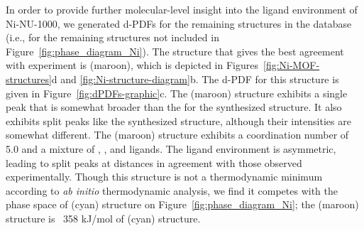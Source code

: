 In order to provide further molecular-level insight into the ligand environment of Ni-NU-1000, we generated d-PDFs for the remaining structures in the database (i.e., for the remaining structures not included in Figure~\ref{fig:phase_diagram_Ni}). The structure that gives the best agreement with experiment is  (maroon), which is depicted in Figures~\ref{fig:Ni-MOF-structures}d and \ref{fig:Ni-structure-diagram}b. The d-PDF for this structure is given in Figure~\ref{fig:dPDFs-graphic}c. The  (maroon) structure exhibits a single  peak that is somewhat broader than the for the synthesized structure. It also exhibits split  peaks like the synthesized structure, although their intensities are somewhat different. The  (maroon) structure exhibits a  coordination number of 5.0 and a mixture of , , and  ligands. The ligand environment is asymmetric, leading to split  peaks at distances in agreement with those observed experimentally. Though this structure is not a thermodynamic minimum according to \textit{ab initio} thermodynamic analysis, we find it competes with the phase space of  (cyan) structure on Figure~\ref{fig:phase_diagram_Ni}; the  (maroon) structure is ~358 kJ/mol of  (cyan) structure.